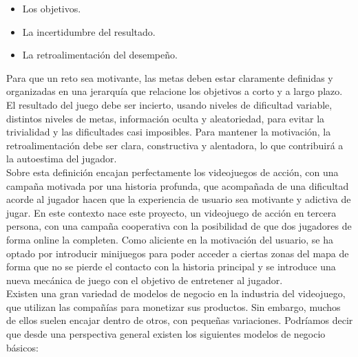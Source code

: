 \begin{itemize}
\item Los objetivos.
\item La incertidumbre del resultado.
\item La retroalimentación del desempeño.
\end{itemize}

Para que un reto sea motivante, las metas deben estar claramente definidas y organizadas en una jerarquía que relacione los objetivos a corto y a largo plazo. El resultado del juego debe ser incierto, usando niveles de dificultad variable, distintos niveles de metas, información oculta y aleatoriedad, para evitar la trivialidad y las dificultades casi imposibles. Para mantener la motivación, la retroalimentación debe ser clara, constructiva y alentadora, lo que contribuirá a la autoestima del jugador.\\


Sobre esta definición encajan perfectamente los videojuegos de acción, con una campaña motivada por una historia profunda, que acompañada de una dificultad acorde al jugador hacen que la experiencia de usuario sea motivante y adictiva de jugar. En este contexto nace este proyecto, un videojuego de acción en tercera persona, con una campaña cooperativa con la posibilidad de que dos jugadores de forma online la completen. Como aliciente en la motivación del usuario, se ha optado por introducir minijuegos para poder acceder a ciertas zonas del mapa de forma que no se pierde el contacto con la historia principal y se introduce una nueva mecánica de juego con el objetivo de entretener al jugador. \\


Existen una gran variedad de modelos de negocio en la industria del videojuego, que utilizan las compañías para monetizar sus productos. Sin embargo, muchos de ellos suelen encajar dentro de otros, con pequeñas variaciones. Podríamos decir que desde una perspectiva general existen los siguientes modelos de negocio básicos:

